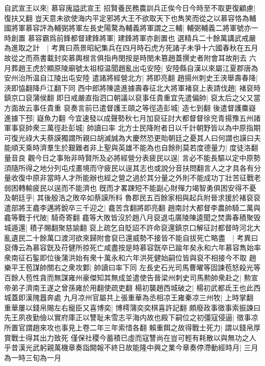 自武宣王以來|{
	慕容廆謚武宣王}
招賢養民務農訓兵正俟今日今時至不取更復顧慮|{
	復扶又翻}
豈天意未欲使海内平定邪將大王不欲取天下也雋笑而從之以慕容恪為輔國將軍慕容評為輔弼將軍左長史陽騖為輔義將軍謂之三輔|{
	輔弼輔義二將軍號亦一時創置}
慕容霸爲前鋒都督建鋒將軍|{
	建鋒將軍亦創置也}
選精兵二十餘萬講武戒嚴為進取之計　|{
	考異曰燕景昭紀集兵在四月時石虎方死諸子未爭十六國春秋在五月故從之而燕書載封奕慕輿根言俱指冉閔按是時閔未篡趙蓋撰史者附會耳故削去}
六月葬趙王虎於顯原陵廟號太祖桓温聞趙亂出屯安陸|{
	安陸縣自漢以來屬江夏郡唐為安州治所温自江陵出屯安陸}
遣諸將經營北方|{
	將即亮翻}
趙揚州刺史王浹舉壽春降|{
	浹即恊翻降戶江翻下同}
西中郎將陳逵進據壽春征北大將軍褚裒上表請伐趙|{
	褚裒時鎮京口裒蒲侯翻}
即日戒嚴直指泗口朝議以裒事任貴重宜先遣偏帥|{
	裒太后之父又當方面故云事任貴重}
裒奏言前已遣督護王頤之等徑造彭城|{
	造七到翻}
後遣督護麋嶷進據下邳|{
	嶷魚力翻}
今宜速發以成聲勢秋七月加裒征討大都督督徐兖青揚豫五州諸軍事裒帥衆三萬徑赴彭城|{
	帥讀曰率}
北方士民降附者日以千計朝野皆以為中原指期可復光祿大夫蔡謨獨謂所親曰胡滅誠為大慶然恐更貽朝廷之憂其人曰何謂也謨曰夫能順天乘時濟羣生於艱難者非上聖與英雄不能為也自餘則莫若度德量力|{
	度徒洛翻量音良}
觀今日之事殆非時賢所及必將經營分表疲民以逞|{
	言必不能長驅以定中原勢須隨所得之地分列屯戍畫境而守疲民以逞其志也或說分音扶問翻言人之才具各有分量收復中原非當時人才所能辦也經之營之過於其分量之外則不能成功丁壯苦征戰老弱困轉輸疲民以逞而不能濟也}
旣而才畧踈短不能副心財殫力竭智勇俱困安得不憂及朝廷乎|{
	其後殷浩之敗卒如蔡謨所料}
魯郡民五百餘家相與起兵附晉求援於褚裒裒遣部將王龕李邁將銳卒三千迎之|{
	龕苦含翻將即亮翻}
趙南討大都督李農帥騎二萬與龕等戰于代陂|{
	騎奇寄翻}
龕等大敗皆沒於趙八月裒退屯廣陵陳逵聞之焚壽春積聚毁城遁還|{
	積子賜翻聚慈諭翻}
裒上疏乞自貶詔不許命裒還鎮京口解征討都督時河北大亂遺民二十餘萬口渡河欲來歸附會裒已還威勢不接皆不能自拔死亡略盡　|{
	考異曰裒傳云為慕容皝及苻健所掠死亡咸盡按是時慕容皝卒已踰年矣永和六年慕容雋始率衆南征石鍳即位後蒲洪始有衆十萬永和六年洪死健始嗣位皆與裒不相接今不取}
趙樂平王苞謀帥關右之衆攻鄴|{
	帥讀曰率下同}
左長史石光司馬曹曜等固諫苞怒殺光等百餘人苞性貪而無謀雍州豪傑知其無成並遣使告晉梁州刺史司馬勲帥衆赴之|{
	勲宣帝弟子濟南王遂之曾孫雍於用翻使疏吏翻}
楊初襲趙西城破之|{
	楊初武都氐王也此西城蓋即漢隗囂奔處}
九月凉州官屬共上張重華為丞相凉王雍秦凉三州牧|{
	上時掌翻}
重華屢以錢帛賜左右寵臣又喜博奕|{
	博樗蒲奕奕棋喜許記翻}
頗廢政事徵事索振諫曰先王夙夜勤儉以實府庫正以讐耻未雪志平海内故也殿下嗣位之初彊寇侵逼|{
	徵事凉所置官謂趙來攻也事見上卷二年三年索惜各翻}
賴重餌之故得戰士死力|{
	謂以錢帛厚賞戰士得其出力致死}
僅保社稷今蓄積已虛而寇讐尚在豈可輕有耗散以與無功之人乎昔漢光武躬親萬機章奏詣闕報不終日故能隆中興之業今章奏停滯動經時月|{
	三月為一時三旬為一月}

